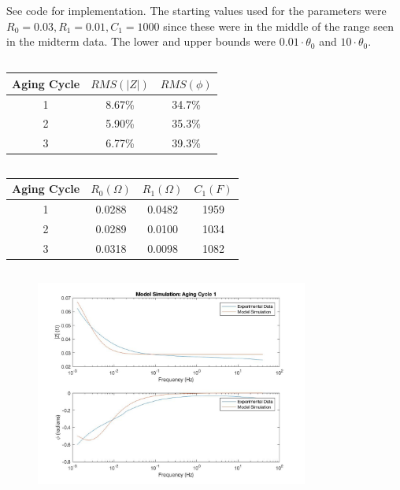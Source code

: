 \documentclass[a4paper,12pt]{extarticle}
\begin{document}
See code for implementation. The starting values used for the parameters were \(R_0 = 0.03, R_1 = 0.01, C_1 = 1000\) since these were in the middle of the range seen in the midterm data. The lower and upper bounds were \(0.01\cdot\theta_0\) and \(10\cdot\theta_0\). 

\subsection{}

\begin{center}
\begin{tabular}{|c|c|c|}
\hline
Aging Cycle & $RMS(|Z|)$ & $RMS(\phi)$ \\
\hline
1 & 8.67\% & 34.7\% \\
\hline
2 & 5.90\% & 35.3\% \\
\hline
3 & 6.77\% & 39.3\% \\
\hline
\end{tabular}
\end{center}


\subsection{}

\begin{center}
\begin{tabular}{|c|c|c|c|}
\hline
Aging Cycle & $R_0 (\Omega)$ & $R_1 (\Omega)$ & $C_1 (F)$ \\
\hline
1 & 0.0288 & 0.0482 & 1959 \\
\hline
2 & 0.0289 & 0.0100 & 1034 \\
\hline
3 & 0.0318 & 0.0098 & 1082 \\
\hline
\end{tabular}
\end{center}

\pagebreak

\subsection{}

\begin{figure}[h]
\centering
\includegraphics[width=0.8\textwidth]{cycle1_model.jpg}
\end{figure}
\end{document}
